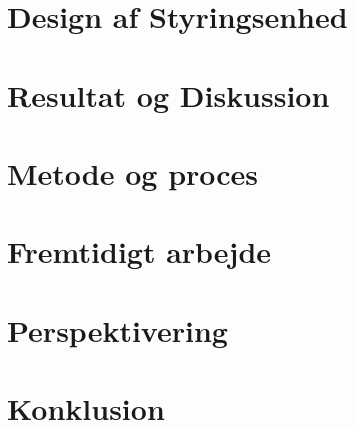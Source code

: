 \documentclass[a4paper, 11pt,oneside,openany, danish]{memoir} %
\begin{document}
\chapter{Design af Styringsenhed}








\chapter{Resultat og Diskussion}
\chapter{Metode og proces}

\chapter{Fremtidigt arbejde}



\chapter{Perspektivering}
\chapter{Konklusion}

\printbibliography
\end{document}
